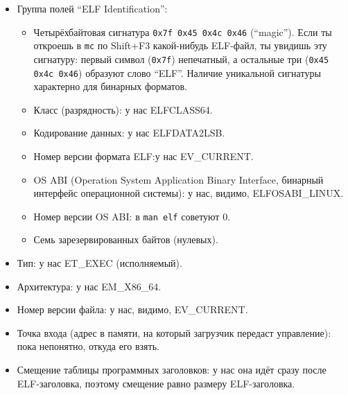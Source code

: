 \documentclass[11pt]{book}
\begin{document}
\begin{minipage}{0.5\textwidth}
\begin{itemize}
\item Группа полей ``ELF Identification'':
    \begin{itemize}
    \item Четырёхбайтовая сигнатура \texttt{0x7f 0x45 0x4c 0x46} (``magic'').
    Если ты откроешь в \texttt{mc} по Shift+F3 какой-нибудь ELF-файл, ты увидишь эту сигнатуру: первый символ (\texttt{0x7f}) непечатный, а остальные три
    (\texttt{0x45 0x4c 0x46}) образуют слово ``ELF''.
    Наличие уникальной сигнатуры характерно для бинарных форматов.
    \item Класс (разрядность): у нас ELFCLASS64.
    \item Кодирование данных: у нас ELFDATA2LSB.
    \item Номер версии формата ELF:у нас EV\_CURRENT.
    \item OS ABI (Operation System Application Binary Interface, бинарный интерфейс операционной системы): у нас, видимо, ELFOSABI\_LINUX.
    \item Номер версии OS ABI: в \texttt{man elf} советуют 0.
    \item Семь зарезервированных байтов (нулевых).
    \end{itemize}
\item Тип: у нас ET\_EXEC (исполняемый).
\item Архитектура: у нас EM\_X86\_64.
\item Номер версии файла: у нас, видимо, EV\_CURRENT.
\item Точка входа (адрес в памяти, на который загрузчик передаст управление): пока непонятно, откуда его взять.
\item Смещение таблицы программных заголовков: у нас она идёт сразу после ELF-заголовка, поэтому смещение равно размеру ELF-заголовка.
\end{itemize}
\end{minipage}
\end{document}
